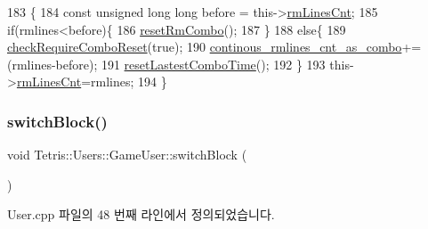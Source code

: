 \begin{DoxyCode}
183                                                                  \{
184                 \textcolor{keyword}{const} \textcolor{keywordtype}{unsigned} \textcolor{keywordtype}{long} \textcolor{keywordtype}{long} before = this->\hyperlink{class_tetris_1_1_users_1_1_game_user_ac5857cc9f0318a8dfbcf551424ccf8f3}{rmLinesCnt};
185                 \textcolor{keywordflow}{if}(rmlines<before)\{
186                     \hyperlink{class_tetris_1_1_users_1_1_game_user_a91a7cf9f13654b44b43ac0d2f1125206}{resetRmCombo}();
187                 \}
188                 \textcolor{keywordflow}{else}\{
189                     \hyperlink{class_tetris_1_1_users_1_1_game_user_a82ea0dfdb99643a1b577a22f5e504346}{checkRequireComboReset}(\textcolor{keyword}{true});
190                     \hyperlink{class_tetris_1_1_users_1_1_game_user_a49692727d4018181845500b0ee765296}{continous\_rmlines\_cnt\_as\_combo}+=(rmlines-before);
191                     \hyperlink{class_tetris_1_1_users_1_1_game_user_a442b35545b13a23dca566cf1b43eb82d}{resetLastestComboTime}();
192                 \}
193                 this->\hyperlink{class_tetris_1_1_users_1_1_game_user_ac5857cc9f0318a8dfbcf551424ccf8f3}{rmLinesCnt}=rmlines;
194             \}
\end{DoxyCode}
\mbox{\label{class_tetris_1_1_users_1_1_game_user_a1d1efa857420c82248fd12da9c08ef77}} 
\subsubsection{\texorpdfstring{switch\+Block()}{switchBlock()}\hspace{0.1cm}{\footnotesize\ttfamily [1/2]}}
{\footnotesize\ttfamily void Tetris\+::\+Users\+::\+Game\+User\+::switch\+Block (\begin{DoxyParamCaption}{ }\end{DoxyParamCaption})}



User.\+cpp 파일의 48 번째 라인에서 정의되었습니다.


